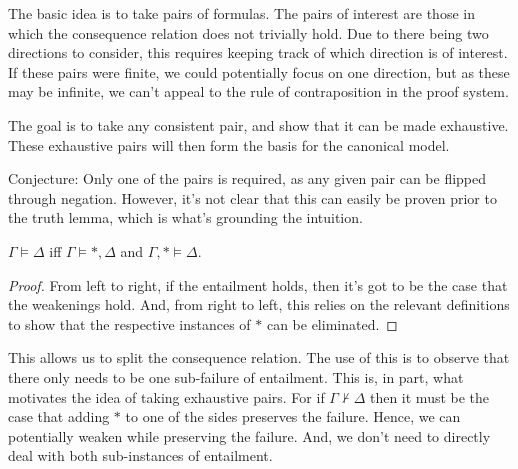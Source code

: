\documentclass[10pt]{article}
\begin{document}
\begin{note}
  The basic idea is to take pairs of formulas. The pairs of interest are those in which the consequence relation does not trivially hold. Due to there being two directions to consider, this requires keeping track of which direction is of interest. If these pairs were finite, we could potentially focus on one direction, but as these may be infinite, we can't appeal to the rule of contraposition in the proof system.

  The goal is to take any consistent pair, and show that it can be made exhaustive. These exhaustive pairs will then form the basis for the canonical model.

  Conjecture: Only one of the pairs is required, as any given pair can be flipped through negation. However, it's not clear that this can easily be proven prior to the truth lemma, which is what's grounding the intuition.
\end{note}





\begin{proposition}\label{prop:finiteness}
  \(\Gamma \vDash \Delta\) iff \(\Gamma \vDash \ast, \Delta\) and \(\Gamma, \ast \vDash \Delta\).
  \begin{proof}
    From left to right, if the entailment holds, then it's got to be the case that the weakenings hold.
And, from right to left, this relies on the relevant definitions to show that the respective instances of \(\ast\) can be eliminated.
  \end{proof}
\end{proposition}

This allows us to split the consequence relation.
The use of this is to observe that there only needs to be one sub-failure of entailment.
This is, in part, what motivates the idea of taking exhaustive pairs.
For if \(\Gamma \nvdash \Delta\) then it must be the case that adding \(\ast\) to one of the sides preserves the failure.
Hence, we can potentially weaken while preserving the failure.
And, we don't need to directly deal with both sub-instances of entailment.
\end{document}
